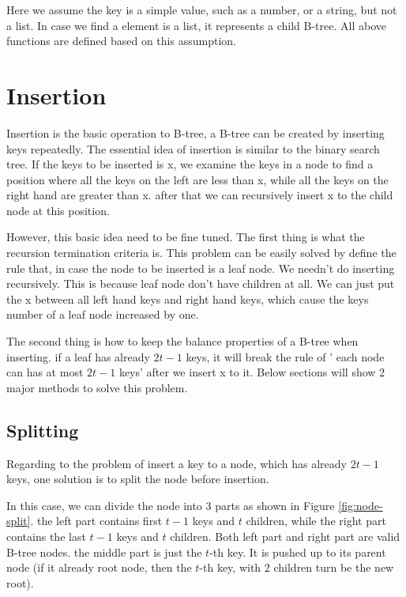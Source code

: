 \documentclass{article}
\begin{document}
Here we assume the key is a simple value, such as a number, or a string,
but not a list. In case we find a element is a list, it represents a
child B-tree. All above functions are defined based on this assumption.

\section{Insertion}
\label{btree-insertion}
Insertion is the basic operation to B-tree, a B-tree can be created by inserting
keys repeatedly. The essential idea of insertion is similar to the binary
search tree. If the keys to be inserted is x, we examine the keys in a
node to find a position where all the keys on the left are less than x,
while all the keys on the right hand are greater than x. after that
we can recursively insert x to the child node at this position.

However, this basic idea need to be fine tuned. The first thing is what
the recursion termination criteria is. This problem can be easily solved
by define the rule that, in case the node to be inserted is a leaf node.
We needn't do inserting recursively. This is because leaf node don't have
children at all. We can just put the x between all left hand keys and
right hand keys, which cause the keys number of a leaf node increased by one.

The second thing is how to keep the balance properties of a B-tree when
inserting. if a leaf has already $2t-1$ keys, it will break the rule of '
each node can has at most $2t-1$ keys' after we insert x to it. Below
sections will show 2 major methods to solve this problem.

\subsection{Splitting}
\label{split}
Regarding to the problem of insert a key to a node, which has already
$2t-1$ keys, one solution is to split the node before insertion.

In this case, we can divide the node into 3 parts as shown in
Figure \ref{fig:node-split}. the left part contains first $t-1$ keys
and $t$ children, while the right part contains the last $t-1$ keys
and $t$ children. Both left part and right part are valid B-tree
nodes. the middle part is just the $t$-th key. It is pushed up
to its parent node (if it already root node, then the $t$-th key,
with 2 children turn be the new root).
\end{document}

